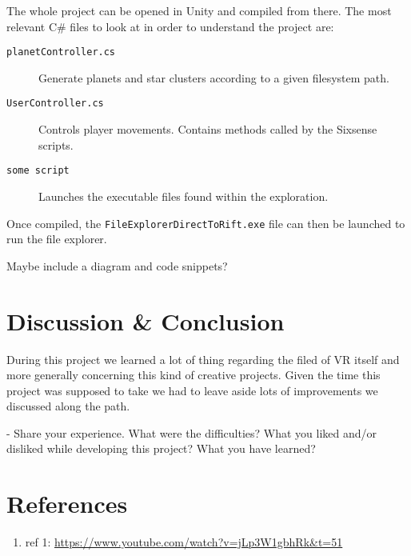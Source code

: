 \documentclass[paper=a4, fontsize=11pt]{scrartcl} %
\numberwithin{equation}{section} %
\numberwithin{figure}{section} %
\numberwithin{table}{section} %
\begin{document}
The whole project can be opened in Unity and compiled from there. The most relevant C\# files to look at in order to understand the project are:
\begin{description}
\item[\texttt{planetController.cs}] Generate planets and star clusters according to a given filesystem path.
\item[\texttt{UserController.cs}] Controls player movements. Contains methods called by the Sixsense scripts.
\item[\texttt{some script}] Launches the executable files found within the exploration.
\end{description}

Once compiled, the \texttt{FileExplorerDirectToRift.exe} file can then be launched to run the file explorer.

Maybe include a diagram and code snippets?


\section{Discussion \& Conclusion}

During this project we learned a lot of thing regarding the filed of VR itself and more generally concerning this kind of creative projects. Given the time this project was supposed to take we had to leave aside lots of improvements we discussed along the path. 

- Share your experience. What were the difficulties? What you liked and/or disliked while developing this project? What you have learned?


\section{References}
\label{sec:refs}
\begin{enumerate}
\item ref 1: \url{https://www.youtube.com/watch?v=jLp3W1gbhRk&t=51}
\end{enumerate}

\end{document}

